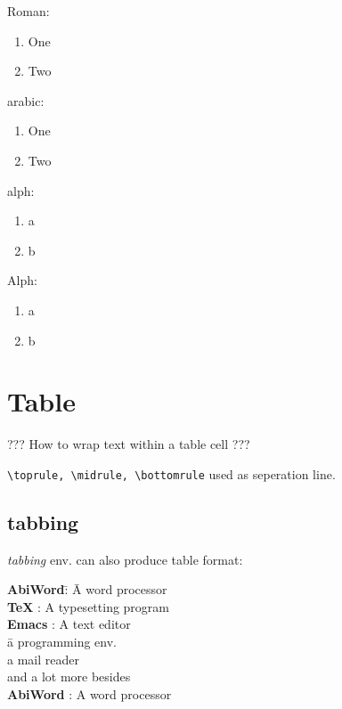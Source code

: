 Roman:
\begin{enumerate}[label=(\Roman*)]
    \item One
    \item Two
\end{enumerate}

arabic:
\begin{enumerate}[label = (\arabic*)]
    \item One
    \item Two
\end{enumerate}

alph:
\begin{enumerate}[label = (\alph*)]
    \item a
    \item b
\end{enumerate}

Alph:
\begin{enumerate}[label = (\Alph*)]
    \item a
    \item b
\end{enumerate}

\section{Table}

{\color{red}??? How to wrap text within a table cell ???}

\verb|\toprule, \midrule, \bottomrule| used as seperation line.

\subsection{tabbing}
\emph{tabbing} env. can also produce table format:
\begin{tabbing}
    \textbf{AbiWord}\quad\= : \= A word processor\kill \\
    \textbf{\TeX}\quad	 \> : \> A typesetting program \\[5pt]
    \textbf{Emacs}\quad	 \> : \> A text editor \\[5pt]
			 \>   \> \quad\= a programming env. \\[5pt]
			 \>   \>      \> a mail reader \\[5pt]
			 \>   \>      \> and a lot more besides \\[5pt]
    \textbf{AbiWord}\quad\> : \> A word processor
\end{tabbing}

